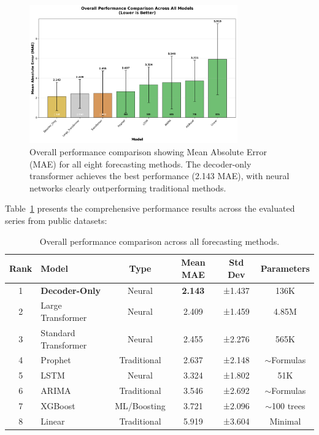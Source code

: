 \documentclass[11pt]{article}
\begin{document}
\begin{figure}[h]
\centering
\includegraphics[width=0.8\textwidth]{../results/figure1_overall_performance.png}
\caption{Overall performance comparison showing Mean Absolute Error (MAE) for all eight forecasting methods. The decoder-only transformer achieves the best performance (2.143 MAE), with neural networks clearly outperforming traditional methods.}
\label{fig:overall_performance}
\end{figure}

Table~\ref{tab:overall_results} presents the comprehensive performance results across the evaluated series from public datasets:

\begin{table}[h]
\centering
\begin{tabular}{@{}clcccc@{}}
\toprule
Rank & Model & Type & Mean MAE & Std Dev & Parameters \\
\midrule
1 & \textbf{Decoder-Only} & Neural & \textbf{2.143} & ±1.437 & 136K \\
2 & Large Transformer & Neural & 2.409 & ±1.459 & 4.85M \\
3 & Standard Transformer & Neural & 2.455 & ±2.276 & 565K \\
4 & Prophet & Traditional & 2.637 & ±2.148 & $\sim$Formulas \\
5 & LSTM & Neural & 3.324 & ±1.802 & 51K \\
6 & ARIMA & Traditional & 3.546 & ±2.692 & $\sim$Formulas \\
7 & XGBoost & ML/Boosting & 3.721 & ±2.096 & $\sim$100 trees \\
8 & Linear & Traditional & 5.919 & ±3.604 & Minimal \\
\bottomrule
\end{tabular}
\caption{Overall performance comparison across all forecasting methods.}
\label{tab:overall_results}
\end{table}
\end{document}
